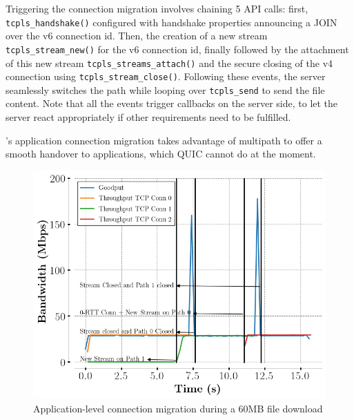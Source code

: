 Triggering the connection migration involves chaining 5 API calls:
first, \texttt{tcpls\_handshake()} configured with handshake properties announcing a
JOIN over the v6 connection id. Then, the creation of a new stream
\texttt{tcpls\_stream\_new()} for the v6 connection id, finally followed by the attachment of this new
stream \texttt{tcpls\_streams\_attach()} and the secure closing of the v4 \tcp
connection using \texttt{tcpls\_stream\_close()}. Following these events, the
server seamlessly switches the path while looping over \texttt{tcpls\_send} to
send the file content. Note that all the events trigger callbacks on the server side, to
let the server react appropriately if other requirements need to be fulfilled.

\tcpls's application connection migration takes advantage of multipath to offer
a smooth handover to applications, which QUIC cannot do at the moment.

\begin{figure}
  \centering
  \includegraphics[scale=0.5]{figures/migration.png}
  \caption{Application-level connection migration during a 60MB file download}
  \label{fig:conn_migration}
\end{figure}
